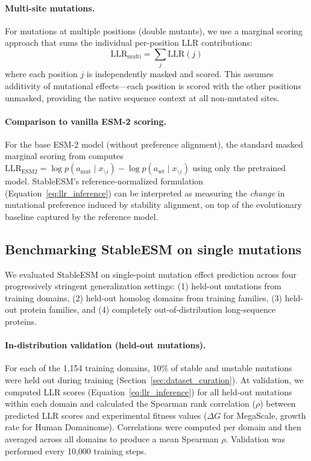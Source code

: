 \paragraph{Multi-site mutations.}
For mutations at multiple positions (\eg double mutants), we use a marginal scoring approach that sums the individual per-position LLR contributions:
\begin{equation}
\text{LLR}_{\text{multi}} = \sum_{j} \text{LLR}(j)
\end{equation}
where each position $j$ is independently masked and scored.
This assumes additivity of mutational effects---each position is scored with the other positions unmasked, providing the native sequence context at all non-mutated sites.

\paragraph{Comparison to vanilla ESM-2 scoring.}
For the base ESM-2 model (without preference alignment), the standard masked marginal scoring from \citet{meier2021language} computes $\text{LLR}_{\text{ESM2}} = \log p(a_{\text{mut}} \mid x_{\setminus i}) - \log p(a_{\text{wt}} \mid x_{\setminus i})$ using only the pretrained model.
StableESM's reference-normalized formulation (Equation~\ref{eq:llr_inference}) can be interpreted as measuring the \textit{change} in mutational preference induced by stability alignment, on top of the evolutionary baseline captured by the reference model.

\subsection{Benchmarking StableESM on single mutations}\label{sec:single_mutation_benchmark}

We evaluated StableESM on single-point mutation effect prediction across four progressively stringent generalization settings: (1) held-out mutations from training domains, (2) held-out homolog domains from training families, (3) held-out protein families, and (4) completely out-of-distribution long-sequence proteins.

\paragraph{In-distribution validation (held-out mutations).}
For each of the 1{,}154 training domains, 10\% of stable and unstable mutations were held out during training (Section~\ref{sec:dataset_curation}).
At validation, we computed LLR scores (Equation~\ref{eq:llr_inference}) for all held-out mutations within each domain and calculated the Spearman rank correlation ($\rho$) between predicted LLR scores and experimental fitness values ($\Delta G$ for MegaScale, growth rate for Human Domainome).
Correlations were computed per domain and then averaged across all domains to produce a mean Spearman $\rho$.
Validation was performed every 10{,}000 training steps.


